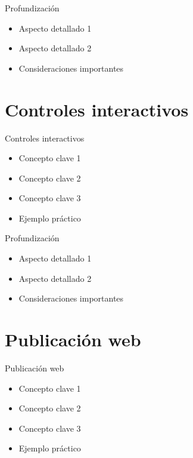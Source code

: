 \documentclass[10pt]{beamer}
\begin{document}
\begin{frame}{Profundización}
    \begin{itemize}
        \item Aspecto detallado 1
        \item Aspecto detallado 2
        \item Consideraciones importantes
    \end{itemize}
\end{frame}

\section{Controles interactivos}

\begin{frame}{Controles interactivos}
    \begin{itemize}
        \item Concepto clave 1
        \item Concepto clave 2
        \item Concepto clave 3
        \item Ejemplo práctico
    \end{itemize}
\end{frame}

\begin{frame}{Profundización}
    \begin{itemize}
        \item Aspecto detallado 1
        \item Aspecto detallado 2
        \item Consideraciones importantes
    \end{itemize}
\end{frame}

\section{Publicación web}

\begin{frame}{Publicación web}
    \begin{itemize}
        \item Concepto clave 1
        \item Concepto clave 2
        \item Concepto clave 3
        \item Ejemplo práctico
    \end{itemize}
\end{frame}
\end{document}
